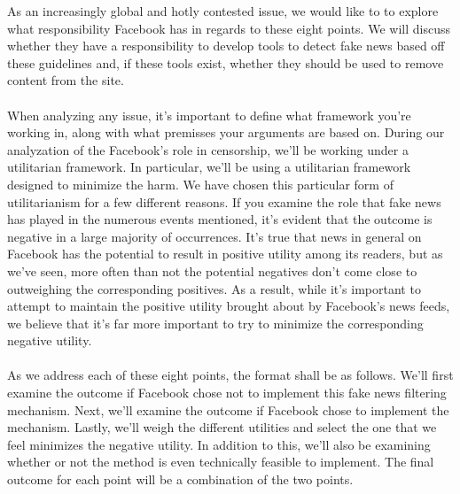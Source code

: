 \documentclass[12pt]{article}
\begin{document}
As an increasingly global and hotly contested issue, we would like to to explore what responsibility Facebook has in regards to these eight points. We will discuss whether they have a responsibility to develop tools to detect fake news based off these guidelines and, if these tools exist, whether they should be used to remove content from the site.

\paragraph{}
When analyzing any issue, it's important to define what framework you're working in, along with what premisses your arguments are based on. During our analyzation of the Facebook's role in censorship, we'll be working under a utilitarian framework. In particular, we'll be using a utilitarian framework designed to minimize the harm. We have chosen this particular form of utilitarianism for a few different reasons. If you examine the role that fake news has played in the numerous events mentioned, it's evident that the outcome is negative in a large majority of occurrences. It's true that news in general on Facebook has the potential to result in positive utility among its readers, but as we've seen, more often than not the potential negatives don't come close to outweighing the corresponding positives. As a result, while it's important to attempt to maintain the positive utility brought about by Facebook's news feeds, we believe that it's far more important to try to minimize the corresponding negative utility.

\paragraph{}
As we address each of these eight points, the format shall be as follows. We'll first examine the outcome if Facebook chose not to implement this fake news filtering mechanism. Next, we'll examine the outcome if Facebook chose to implement the mechanism. Lastly, we'll weigh the different utilities and select the one that we feel minimizes the negative utility. In addition to this, we'll also be examining whether or not the method is even technically feasible to implement. The final outcome for each point will be a combination of the two points. 
\end{document}
